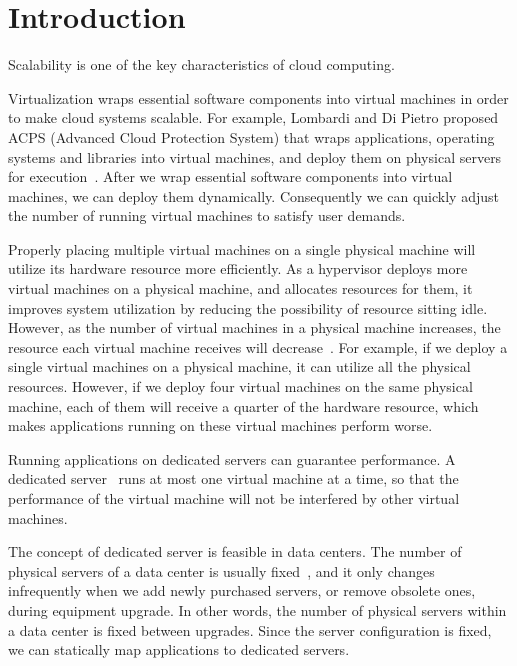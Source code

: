 \chapter{Introduction}

Scalability is one of the key characteristics of cloud computing.

Virtualization wraps essential software components into virtual machines
in order to make cloud systems scalable.  For example, Lombardi and Di
Pietro proposed ACPS (Advanced Cloud Protection System) that wraps
applications, operating systems and libraries into virtual machines, and
deploy them on physical servers for
execution~\cite{cite:secure_virt_for_cloud, cite:cloud_issue}.  After we wrap
essential software components into virtual machines, we can deploy them
dynamically.  Consequently we can quickly adjust the number of running
virtual machines to satisfy user demands.

Properly placing multiple virtual machines on a single physical machine
will utilize its hardware resource more efficiently.  As a hypervisor
deploys more virtual machines on a physical machine, and allocates
resources for them, it improves system utilization by reducing the
possibility of resource sitting idle.  However, as the number of virtual
machines in a physical machine increases, the resource each virtual
machine receives will decrease~\cite{cite:resource_overbooking}.  For
example, if we deploy a single virtual machines on a physical machine,
it can utilize all the physical resources.  However, if we deploy four
virtual machines on the same physical machine, each of them will receive
a quarter of the hardware resource, which makes applications running on
these virtual machines perform worse.

Running applications on dedicated servers can guarantee performance.  A
dedicated server~\cite{cite:dedicated_hosting} runs at most one virtual
machine at a time, so that the performance of the virtual machine will
not be interfered by other virtual machines.

The concept of dedicated server is feasible in data centers.  The
number of physical servers of a data center is usually
fixed~\cite{cite:maintenance_framework}, and it only changes infrequently
when we add newly purchased servers, or remove obsolete ones, during
equipment upgrade.  In other words, the number of physical servers
within a data center is fixed between upgrades.  Since the server
configuration is fixed, we can statically map applications to
dedicated servers.

